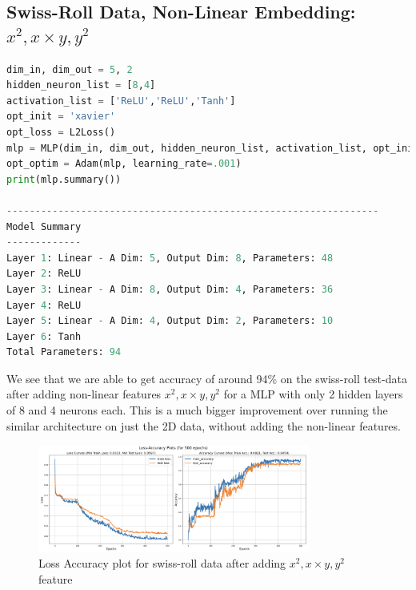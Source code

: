 \subsection{Swiss-Roll Data, Non-Linear Embedding: $x^2, x\times y, y^2$}


\begin{solve}    
\begin{lstlisting}[language=python, title = MLP used for swiss-roll data after adding non linear features]
dim_in, dim_out = 5, 2
hidden_neuron_list = [8,4]
activation_list = ['ReLU','ReLU','Tanh']
opt_init = 'xavier'
opt_loss = L2Loss()
mlp = MLP(dim_in, dim_out, hidden_neuron_list, activation_list, opt_init)
opt_optim = Adam(mlp, learning_rate=.001)
print(mlp.summary())

-----------------------------------------------------------------
Model Summary
-------------
Layer 1: Linear - A Dim: 5, Output Dim: 8, Parameters: 48
Layer 2: ReLU
Layer 3: Linear - A Dim: 8, Output Dim: 4, Parameters: 36
Layer 4: ReLU
Layer 5: Linear - A Dim: 4, Output Dim: 2, Parameters: 10
Layer 6: Tanh
Total Parameters: 94
\end{lstlisting}
    


We see that we are able to get accuracy of around 94\% on the swiss-roll test-data after adding non-linear features $x^2, x\times y, y^2$ for a MLP with only 2 hidden layers of 8 and 4 neurons each. This is a much bigger improvement over running the similar architecture on just the 2D data, without adding the non-linear features.

\begin{figure}[H]
    \centering
    \includegraphics[width=0.8\textwidth]{plots/7_spiral_accloss.png}
    \caption{Loss Accuracy plot for swiss-roll data after adding $x^2, x\times y, y^2$ feature}


\end{figure}
\end{solve}

